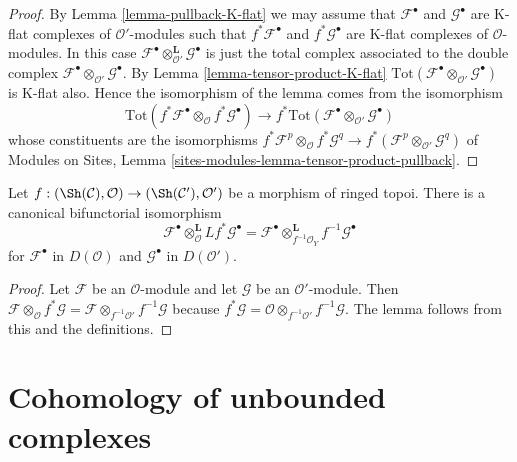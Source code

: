 \begin{proof}
By Lemma \ref{lemma-pullback-K-flat} we may assume that $\mathcal{F}^\bullet$
and $\mathcal{G}^\bullet$ are K-flat complexes of $\mathcal{O}'$-modules
such that $f^*\mathcal{F}^\bullet$ and $f^*\mathcal{G}^\bullet$
are K-flat complexes of $\mathcal{O}$-modules. In this case
$\mathcal{F}^\bullet \otimes_{\mathcal{O}'}^{\mathbf{L}} \mathcal{G}^\bullet$
is just the total complex associated to the double complex
$\mathcal{F}^\bullet \otimes_{\mathcal{O}'} \mathcal{G}^\bullet$. By
Lemma \ref{lemma-tensor-product-K-flat}
$\text{Tot}(\mathcal{F}^\bullet \otimes_{\mathcal{O}'} \mathcal{G}^\bullet)$
is K-flat also. Hence the isomorphism of the lemma comes from the
isomorphism
$$
\text{Tot}(f^*\mathcal{F}^\bullet \otimes_{\mathcal{O}}
f^*\mathcal{G}^\bullet)
\longrightarrow
f^*\text{Tot}(\mathcal{F}^\bullet \otimes_{\mathcal{O}'} \mathcal{G}^\bullet)
$$
whose constituents are the isomorphisms
$f^*\mathcal{F}^p \otimes_{\mathcal{O}} f^*\mathcal{G}^q \to
f^*(\mathcal{F}^p \otimes_{\mathcal{O}'} \mathcal{G}^q)$ of
Modules on Sites, Lemma \ref{sites-modules-lemma-tensor-product-pullback}.
\end{proof}

\begin{lemma}
\label{lemma-variant-derived-pullback}
Let $f : (\Sh(\mathcal{C}), \mathcal{O}) \to (\Sh(\mathcal{C}'), \mathcal{O}')$
be a morphism of ringed topoi. There is a canonical bifunctorial
isomorphism
$$
\mathcal{F}^\bullet
\otimes_\mathcal{O}^{\mathbf{L}}
Lf^*\mathcal{G}^\bullet
=
\mathcal{F}^\bullet 
\otimes_{f^{-1}\mathcal{O}_Y}^{\mathbf{L}}
f^{-1}\mathcal{G}^\bullet 
$$
for $\mathcal{F}^\bullet$ in $D(\mathcal{O})$ and
$\mathcal{G}^\bullet$ in $D(\mathcal{O}')$.
\end{lemma}

\begin{proof}
Let $\mathcal{F}$ be an $\mathcal{O}$-module and let $\mathcal{G}$
be an $\mathcal{O}'$-module. Then
$\mathcal{F} \otimes_{\mathcal{O}} f^*\mathcal{G} =
\mathcal{F} \otimes_{f^{-1}\mathcal{O}'} f^{-1}\mathcal{G}$
because
$f^*\mathcal{G} =
\mathcal{O} \otimes_{f^{-1}\mathcal{O}'} f^{-1}\mathcal{G}$.
The lemma follows from this and the definitions.
\end{proof}








\section{Cohomology of unbounded complexes}
\label{section-unbounded}

